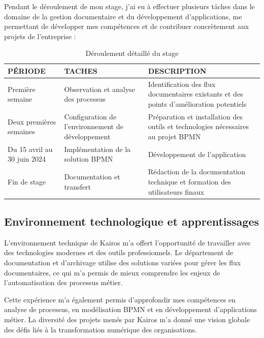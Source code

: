     Pendant le déroulement de mon stage, j'ai eu à effectuer plusieurs tâches dans le domaine de la gestion documentaire et du développement d'applications, me permettant de développer mes compétences et de contribuer concrètement aux projets de l'entreprise :
    \begin{table}[H]
        \centering
        \begin{tabularx}{\textwidth}{|l|>{\raggedright\arraybackslash}X|>{\raggedright\arraybackslash}X|}
            \hline
            \textbf{PÉRIODE} & \textbf{TACHES} & \textbf{DESCRIPTION} \\
            \hline
            Première semaine & Observation et analyse des processus & Identification des flux documentaires existants et des points d'amélioration potentiels \\
            \hline
            Deux premières semaines & Configuration de l'environnement de développement & Préparation et installation des outils et technologies nécessaires au projet BPMN \\
            \hline
            Du 15 avril au 30 juin 2024 & Implémentation de la solution BPMN & Développement de l'application \\
            \hline
            Fin de stage & Documentation et transfert & Rédaction de la documentation technique et formation des utilisateurs finaux \\
            \hline
        \end{tabularx}
        \caption{Déroulement détaillé du stage}
        \label{tab:deroulement_stage}
    \end{table}
    
    \subsection{Environnement technologique et apprentissages}
    
    L'environnement technique de Kairos m'a offert l'opportunité de travailler avec des technologies modernes et des outils professionnels. Le département de documentation et d'archivage utilise des solutions variées pour gérer les flux documentaires, ce qui m'a permis de mieux comprendre les enjeux de l'automatisation des processus métier.
    
    Cette expérience m'a également permis d'approfondir mes compétences en analyse de processus, en modélisation BPMN et en développement d'applications métier. La diversité des projets menés par Kairos m'a donné une vision globale des défis liés à la transformation numérique des organisations.

